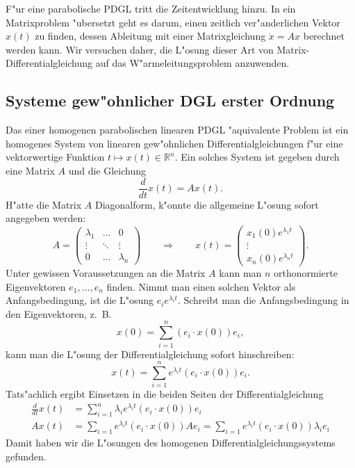 F"ur eine parabolische PDGL tritt die Zeitentwicklung hinzu. In
ein Matrixproblem "ubersetzt geht es darum, einen zeitlich
ver"anderlichen Vektor $x(t)$ zu finden, dessen Ableitung mit einer
Matrixgleichung $\dot x=Ax$ berechnet werden kann. Wir versuchen daher,
die L"osung dieser Art von Matrix-Differentialgleichung auf das
W"armeleitungsproblem anzuwenden.

\subsection{Systeme gew"ohnlicher DGL erster Ordnung}
Das einer homogenen parabolischen linearen PDGL "aquivalente Problem
ist ein homogenes System
von linearen gew"ohnlichen Differentialgleichungen f"ur eine vektorwertige Funktion
$t\mapsto x(t)\in\mathbb R^n$.
Ein solches System ist gegeben durch eine Matrix $A$ und die Gleichung
$$\frac{d}{dt}x(t)=Ax(t).$$
H"atte die Matrix $A$ Diagonalform, k"onnte die allgemeine L"osung 
sofort angegeben werden:
$$A=\begin{pmatrix}
\lambda_1&\dots&0\\
\vdots&\ddots&\vdots\\
0&\dots&\lambda_n
\end{pmatrix}
\qquad\Rightarrow\qquad
x(t)=\begin{pmatrix}
x_1(0)e^{\lambda_1t}
\\
\vdots
\\
x_n(0)e^{\lambda_nt}
\end{pmatrix}.$$
Unter gewissen Voraussetzungen an die Matrix $A$ kann man $n$
orthonormierte Eigenvektoren
$e_1,\dots,e_n$ finden. Nimmt man einen solchen Vektor als
Anfangsbedingung, ist die L"osung $e_ie^{\lambda_it}$. Schreibt man die
Anfangsbedingung in den Eigenvektoren, z.~B.
$$
x(0)=\sum_{i=1}^n(e_i \cdot x(0))e_i,
$$
kann man die L"osung der Differentialgleichung sofort hinschreiben:
\begin{equation}
x(t)=\sum_{i=1}^n
e^{\lambda_i t}
(e_i\cdot x(0))e_i
.
\label{development}
\end{equation}
Tats"achlich ergibt Einsetzen in die beiden Seiten der Differentialgleichung
\begin{align*}
\frac{d}{dt}x(t)&=\sum_{i=1}^n\lambda_ie^{\lambda_i t}(e_i\cdot x(0))e_i
\\
Ax(t)
&=\sum_{i=1}e^{\lambda_it}(e_i\cdot x(0))Ae_i
=\sum_{i=1}e^{\lambda_it}(e_i\cdot x(0))\lambda_i e_i
\end{align*}
Damit haben wir die L"osungen des homogenen Differentialgleichungssystems
gefunden.

